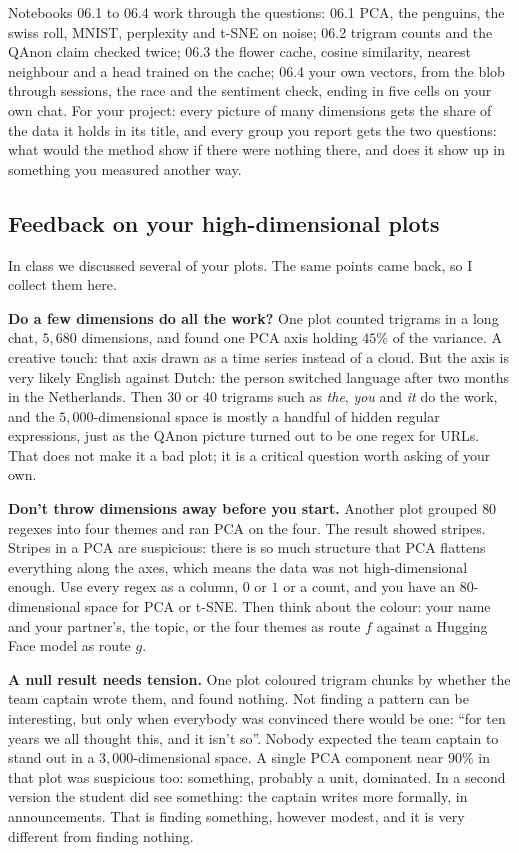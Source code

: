 \documentclass[12pt, a4paper]{article}
\theoremstyle{definition}
\theoremstyle{remark}
\begin{document}
Notebooks 06.1 to 06.4 work through the questions: 06.1 PCA, the penguins, the swiss roll, MNIST, perplexity and t-SNE on noise; 06.2 trigram counts and the QAnon claim checked twice; 06.3 the flower cache, cosine similarity, nearest neighbour and a head trained on the cache; 06.4 your own vectors, from the blob through sessions, the race and the sentiment check, ending in five cells on your own chat. For your project: every picture of many dimensions gets the share of the data it holds in its title, and every group you report gets the two questions: what would the method show if there were nothing there, and does it show up in something you measured another way.

\subsection{Feedback on your high-dimensional plots}
\label{sec:lesson6-feedback}
In class we discussed several of your plots. The same points came back, so I collect them here.

\textbf{Do a few dimensions do all the work?} One plot counted trigrams in a long chat, $5{,}680$ dimensions, and found one PCA axis holding $45\%$ of the variance. A creative touch: that axis drawn as a time series instead of a cloud. But the axis is very likely English against Dutch: the person switched language after two months in the Netherlands. Then $30$ or $40$ trigrams such as \emph{the}, \emph{you} and \emph{it} do the work, and the $5{,}000$-dimensional space is mostly a handful of hidden regular expressions, just as the QAnon picture turned out to be one regex for URLs. That does not make it a bad plot; it is a critical question worth asking of your own.

\textbf{Don't throw dimensions away before you start.} Another plot grouped $80$ regexes into four themes and ran PCA on the four. The result showed stripes. Stripes in a PCA are suspicious: there is so much structure that PCA flattens everything along the axes, which means the data was not high-dimensional enough. Use every regex as a column, $0$ or $1$ or a count, and you have an $80$-dimensional space for PCA or t-SNE. Then think about the colour: your name and your partner's, the topic, or the four themes as route $f$ against a Hugging Face model as route $g$.

\textbf{A null result needs tension.} One plot coloured trigram chunks by whether the team captain wrote them, and found nothing. Not finding a pattern can be interesting, but only when everybody was convinced there would be one: ``for ten years we all thought this, and it isn't so''. Nobody expected the team captain to stand out in a $3{,}000$-dimensional space. A single PCA component near $90\%$ in that plot was suspicious too: something, probably a unit, dominated. In a second version the student did see something: the captain writes more formally, in announcements. That is finding something, however modest, and it is very different from finding nothing.
\end{document}
